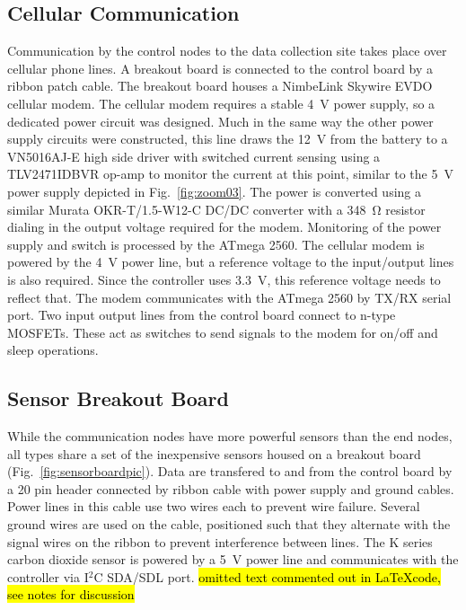 \documentclass[journal]{IEEEtran}
\begin{document}
\subsection{Cellular Communication}
\label{sec:cellsection}
Communication by the control nodes to the data collection site takes place over cellular phone lines.  A breakout board is connected to the control board by a ribbon patch cable.  The breakout board houses a NimbeLink Skywire EVDO cellular modem.  The cellular modem requires a stable \SI{4}{\volt} power supply, so a dedicated power circuit was designed.  Much in the same way the other power supply circuits were constructed, this line draws the \SI{12}{\volt} from the battery to a VN5016AJ-E high side driver with switched current sensing using a TLV2471IDBVR op-amp to monitor the current at this point, similar to the \SI{5}{\volt} power supply depicted in Fig.~\ref{fig:zoom03}.  The power is converted using a similar Murata OKR-T/1.5-W12-C DC/DC converter with a \SI{348}{\ohm} resistor dialing in the output voltage required for the modem.  Monitoring of the power supply and switch is processed by the ATmega 2560.  The cellular modem is powered by the \SI{4}{\volt} power line, but a reference voltage to the input/output lines is also required.  Since the controller uses \SI{3.3}{\volt}, this reference voltage needs to reflect that.  The modem communicates with the ATmega 2560 by TX/RX serial port.  Two input output lines from the control board connect to n-type MOSFETs.  These act as switches to send signals to the modem for on/off and sleep operations.  

\subsection{Sensor Breakout Board}
While the communication nodes have more powerful sensors than the end nodes, all types share a set of the inexpensive sensors housed on a breakout board (Fig.~\ref{fig:sensorboardpic}).  Data are transfered to and from the control board by a 20 pin header connected by ribbon cable with power supply and ground cables.  Power lines in this cable use two wires each to prevent wire failure.  Several ground wires are used on the cable, positioned such that they alternate with the signal wires on the ribbon to prevent interference between lines.  The K series carbon dioxide sensor is powered by a \SI{5}{\volt} power line and communicates with the controller via I$^2$C SDA/SDL port.  \hl{omitted text commented out in \LaTeX code, see notes for discussion}
\end{document}
